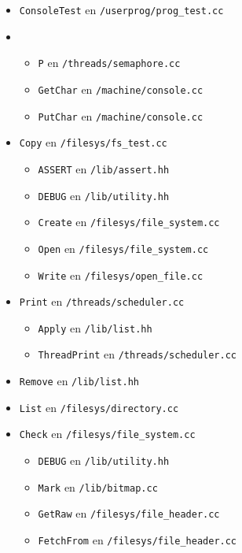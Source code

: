 \documentclass[11pt]{article}
\begin{document}
\begin{enumerate}
\begin{itemize}
\begin{itemize}
        \end{itemize}
    \item \texttt{ConsoleTest} en \texttt{/userprog/prog\_test.cc}
    \item 
        \begin{itemize}
            \item \texttt{P} en \texttt{/threads/semaphore.cc}
            \item \texttt{GetChar} en \texttt{/machine/console.cc}
            \item \texttt{PutChar} en \texttt{/machine/console.cc}
        \end{itemize}
    \item \texttt{Copy} en \texttt{/filesys/fs\_test.cc}
        \begin{itemize}
            \item \texttt{ASSERT} en \texttt{/lib/assert.hh}
            \item \texttt{DEBUG} en \texttt{/lib/utility.hh}
            \item \texttt{Create} en \texttt{/filesys/file\_system.cc}
            \item \texttt{Open} en \texttt{/filesys/file\_system.cc}
            \item \texttt{Write} en \texttt{/filesys/open\_file.cc}
        \end{itemize}
    \item \texttt{Print} en \texttt{/threads/scheduler.cc}
        \begin{itemize}
            \item \texttt{Apply} en \texttt{/lib/list.hh}
            \item \texttt{ThreadPrint} en \texttt{/threads/scheduler.cc}
        \end{itemize}
    \item \texttt{Remove} en \texttt{/lib/list.hh}
    \item \texttt{List} en \texttt{/filesys/directory.cc}
    \item \texttt{Check} en \texttt{/filesys/file\_system.cc}
        \begin{itemize}
            \item \texttt{DEBUG} en \texttt{/lib/utility.hh}
            \item \texttt{Mark} en \texttt{/lib/bitmap.cc}
            \item \texttt{GetRaw} en \texttt{/filesys/file\_header.cc}
            \item \texttt{FetchFrom} en \texttt{/filesys/file\_header.cc}

\end{itemize}
\end{itemize}
\end{enumerate}
\end{document}
